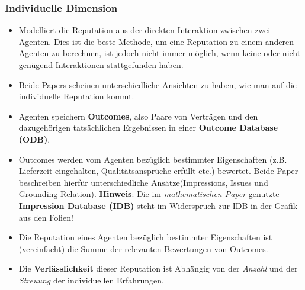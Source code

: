 \documentclass{article} %
\begin{document}
	\subsubsection{Individuelle Dimension}
	\begin{itemize}
		\item Modelliert die Reputation aus der direkten Interaktion zwischen zwei Agenten.
		Dies ist die beste Methode, um eine Reputation zu einem anderen Agenten zu berechnen, ist jedoch nicht immer möglich, wenn keine oder nicht genügend Interaktionen stattgefunden haben.
		\item Beide Papers scheinen unterschiedliche Ansichten zu haben, wie man auf die individuelle Reputation kommt.
		\item Agenten speichern \textbf{Outcomes}, also Paare von Verträgen und den dazugehörigen tatsächlichen Ergebnissen in einer \textbf{Outcome Database (ODB)}.
		\item Outcomes werden vom Agenten bezüglich bestimmter Eigenschaften (z.B. Lieferzeit eingehalten, Qualitätsansprüche erfüllt etc.) bewertet.
		Beide Paper beschreiben hierfür unterschiedliche Ansätze(Impressions, Issues und Grounding Relation).
		\textbf{Hinweis}: Die im \emph{mathematischen Paper} genutzte \textbf{Impression Database (IDB)} steht im Widerspruch zur IDB in der Grafik aus den Folien!
		\item Die Reputation eines Agenten bezüglich bestimmter Eigenschaften ist (vereinfacht) die Summe der relevanten Bewertungen von Outcomes.
		\item Die \textbf{Verlässlichkeit} dieser Reputation ist Abhängig von der \emph{Anzahl} und der \emph{Streuung} der individuellen Erfahrungen.
	\end{itemize}
\end{document}

